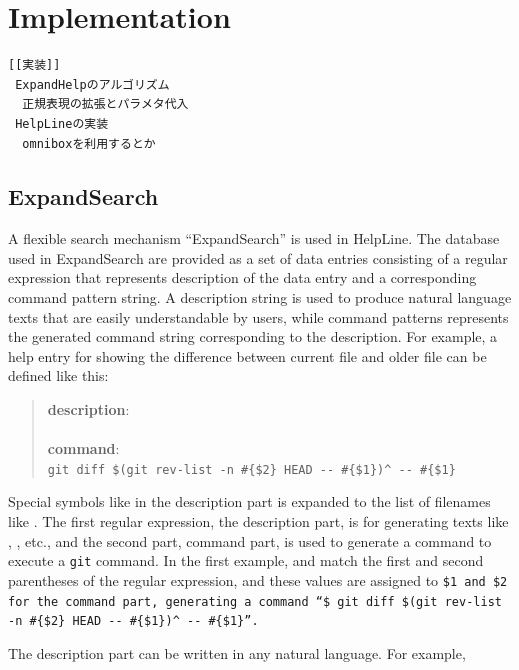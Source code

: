 \documentclass[manuscript,anonymous,review]{acmart}
\def\HL{\textsf{HelpLine}}
\def\GIT{\texttt{git}}
\def\ES{\textsf{ExpandSearch}}
\begin{document}
\section{Implementation}

\begin{verbatim}
[[実装]]
 ExpandHelpのアルゴリズム
  正規表現の拡張とパラメタ代入
 HelpLineの実装
  omniboxを利用するとか
\end{verbatim}

\subsection{ExpandSearch}

A flexible search mechanism ``{\ES}'' is used in {\HL}.
%
The database used in {\ES} are provided as a set of data entries
consisting of a regular expression that represents description of the data entry
and a corresponding command pattern string.
A description string is used to produce natural language texts
that are easily understandable by users,
while command patterns represents the generated command string
corresponding to the description.
%
For example, a help entry for showing the difference between
current file and older file can be defined like this:

\begin{quote}
  \textbf{description}: \\
  \\
  \textbf{command}: \\
  {\smallfont\verb|git diff $(git rev-list -n #{$2} HEAD -- #{$1})^ -- #{$1}|}
\end{quote}

Special symbols like  in the description part is expanded to
the list of filenames like .
The first regular expression, the description part,
is for generating texts like
, 
, etc.,
and the second part, command part,
is used to generate a command to execute a {\GIT} command.
In the first example,  and 
match the first and second parentheses of the regular expression, and
these values are assigned to \tt{\$1} and \tt{\$2}
for the command part, generating a command
``{\smallfont\verb|$ git diff $(git rev-list -n #{$2} HEAD -- #{$1})^|}
{\smallfont\verb|-- #{$1}|}''.

The description part can be written in any natural language.
For example,
\end{document}
